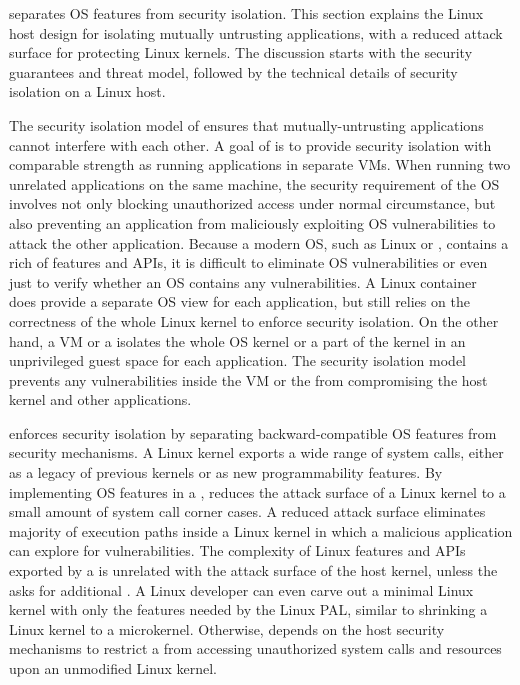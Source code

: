 \label{sec:linux:security}

\graphene{} separates OS features from security isolation.
This section explains the Linux host design for isolating mutually untrusting applications, with a reduced attack surface for protecting Linux kernels.
The discussion starts with the security guarantees and threat model, followed by the technical details of security isolation on a Linux host.




The security isolation model of \graphene{} ensures that mutually-untrusting applications cannot interfere with each other.
A goal of \graphene{} is to provide security isolation with comparable strength as
running applications in separate VMs.
When running two unrelated applications on the same machine,
the security requirement
of the OS involves not only blocking unauthorized access under normal circumstance,
but also preventing an application
from maliciously exploiting OS vulnerabilities to attack the other application.
Because a modern OS, such as Linux or \win{}, contains a rich of features and APIs,
it is difficult to eliminate OS vulnerabilities
or even just to verify whether an OS contains any vulnerabilities. 
A Linux container~\cite{lxc}
does provide a separate OS view for each application,
but still relies on the correctness of the whole Linux kernel to enforce security isolation.
On the other hand, a VM or a \libos{}
isolates the whole OS kernel or a part of the kernel in an unprivileged guest space
for each application.
The security isolation model prevents
any vulnerabilities inside the VM or the \libos{} from compromising the host kernel and other applications.



\graphene{} enforces security isolation %
by separating 
backward-compatible OS features from security mechanisms.
A Linux kernel exports a wide range of system calls,
either as a legacy of previous kernels or as new programmability features. %
By implementing OS features in a \libos{},
\graphene{} reduces the attack surface of a Linux kernel
to a small amount of system call corner cases.
A reduced attack surface
eliminates majority of execution paths inside a Linux kernel in which a malicious application can explore for vulnerabilities.
The complexity of Linux features and APIs exported by a \libos{} is unrelated with the attack surface of the host kernel,
unless the \libos{} asks for additional \hostapis{}.
A Linux developer can even carve out a minimal Linux kernel with only the features needed by the Linux PAL,
similar to shrinking a Linux kernel to a microkernel.
Otherwise, \graphene{} depends on the host security mechanisms to restrict a \libos{} from accessing unauthorized system calls and resources upon an unmodified Linux kernel.





